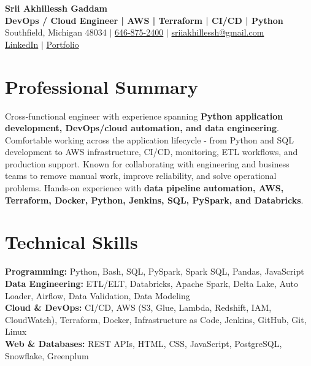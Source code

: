 \documentclass[letterpaper,10pt]{article}
\begin{document}
\fontsize{9.35pt}{10.45pt}\selectfont

\begin{center}
    {\LARGE \textbf{Srii Akhillessh Gaddam}} \\[-1pt]
    \textbf{DevOps / Cloud Engineer | AWS | Terraform | CI/CD | Python} \\[2pt]
    Southfield, Michigan 48034 $|$
    \href{tel:6468752400}{646-875-2400} $|$
    \href{mailto:sriiakhillessh@gmail.com}{sriiakhillessh@gmail.com} \\[1pt]
    \href{https://www.linkedin.com/in/srii-akhiilessh-gaddam-b48668191/}{LinkedIn} $|$
    \href{https://sriiakhillesshg.github.io/portfolio/}{Portfolio}
\end{center}
\vspace{-8pt}

\section{Professional Summary}
\small{Cross-functional engineer with experience spanning \textbf{Python application development, DevOps/cloud automation, and data engineering}. Comfortable working across the application lifecycle - from Python and SQL development to AWS infrastructure, CI/CD, monitoring, ETL workflows, and production support. Known for collaborating with engineering and business teams to remove manual work, improve reliability, and solve operational problems. Hands-on experience with \textbf{data pipeline automation, AWS, Terraform, Docker, Python, Jenkins, SQL, PySpark, and Databricks}.}

\section{Technical Skills}
\small{
\textbf{Programming:} Python, Bash, SQL, PySpark, Spark SQL, Pandas, JavaScript \\
\textbf{Data Engineering:} ETL/ELT, Databricks, Apache Spark, Delta Lake, Auto Loader, Airflow, Data Validation, Data Modeling \\
\textbf{Cloud \& DevOps:} CI/CD, AWS (S3, Glue, Lambda, Redshift, IAM, CloudWatch), Terraform, Docker, Infrastructure as Code, Jenkins, GitHub, Git, Linux \\
\textbf{Web \& Databases:} REST APIs, HTML, CSS, JavaScript, PostgreSQL, Snowflake, Greenplum
}
\end{document}
